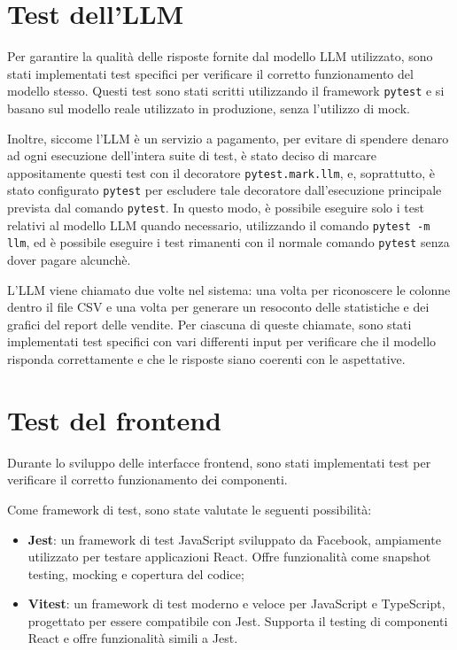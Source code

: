 \section{Test dell’LLM}

Per garantire la qualità delle risposte fornite dal modello LLM utilizzato, sono stati implementati test specifici per verificare il corretto funzionamento del modello stesso. Questi test sono stati scritti utilizzando il framework \texttt{pytest} e si basano sul modello reale utilizzato in produzione, senza l'utilizzo di mock.

Inoltre, siccome l'LLM è un servizio a pagamento, per evitare di spendere denaro ad ogni esecuzione dell'intera suite di test, è stato deciso di marcare appositamente questi test con il decoratore \texttt{pytest.mark.llm}, e, soprattutto, è stato configurato \texttt{pytest} per escludere tale decoratore dall'esecuzione principale prevista dal comando \texttt{pytest}.
In questo modo, è possibile eseguire solo i test relativi al modello LLM quando necessario, utilizzando il comando \texttt{pytest -m llm}, ed è possibile eseguire i test rimanenti con il normale comando \texttt{pytest} senza dover pagare alcunchè.

L'LLM viene chiamato due volte nel sistema: una volta per riconoscere le colonne dentro il file CSV e una volta per generare un resoconto delle statistiche e dei grafici del report delle vendite. Per ciascuna di queste chiamate, sono stati implementati test specifici con vari differenti input per verificare che il modello risponda correttamente e che le risposte siano coerenti con le aspettative.


\section{Test del frontend}

Durante lo sviluppo delle interfacce frontend, sono stati implementati test per verificare il corretto funzionamento dei componenti. 

Come framework di test, sono state valutate le seguenti possibilità:
\begin{itemize}
    \item \textbf{Jest}: un framework di test JavaScript sviluppato da Facebook, ampiamente utilizzato per testare applicazioni React. Offre funzionalità come snapshot testing, mocking e copertura del codice;
    \item \textbf{Vitest}: un framework di test moderno e veloce per JavaScript e TypeScript, progettato per essere compatibile con Jest. Supporta il testing di componenti React e offre funzionalità simili a Jest.
\end{itemize}

